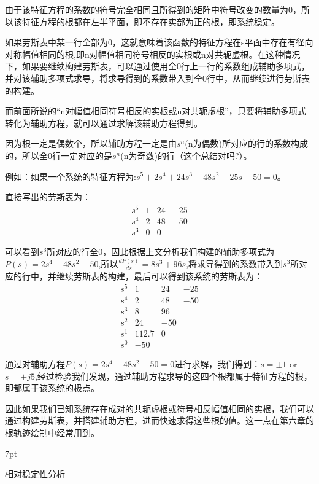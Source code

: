 \documentclass{article}
\numberwithin{equation}{section}
\numberwithin{figure}{section}
\newenvironment{formal}{%
\def\FrameCommand{%
\hspace{1pt}%
{\color{DarkBlue}\vrule width 2pt}%
{\color{formalshade}\vrule width 4pt}%
\colorbox{formalshade}%
}%
\MakeFramed{\advance\hsize-\width\FrameRestore}%
\noindent\hspace{-4.55pt}%
\begin{adjustwidth}{}{7pt}%
\vspace{2pt}\vspace{2pt}%
}
{%
\vspace{2pt}\end{adjustwidth}\endMakeFramed%
}
\begin{document}
由于该特征方程的系数的符号完全相同且所得到的矩阵中符号改变的数量为0，所以该特征方程的根都在左半平面，即不存在实部为正的根，即系统稳定。

如果劳斯表中某一行全部为0，这就意味着该函数的特征方程在s平面中存在有径向对称幅值相同的根,即n对幅值相同符号相反的实根或n对共轭虚根。在这种情况下，如果要继续构建劳斯表，可以通过使用全0行上一行的系数组成辅助多项式，并对该辅助多项式求导，将求导得到的系数带入到全0行中，从而继续进行劳斯表的构建。

而前面所说的“n对幅值相同符号相反的实根或n对共轭虚根”，只要将辅助多项式转化为辅助方程，就可以通过求解该辅助方程得到。

因为根一定是偶数个，所以辅助方程一定是由$s^n$(n为偶数)所对应的行的系数构成的，所以全0行一定对应的是$s^n$(n为奇数)的行（这个总结对吗?）。

例如：如果一个系统的特征方程为:$s^5+2s^4+24s^3+48s^2-25s-50=0$。

直接写出的劳斯表为：
\begin{equation}
    \begin{matrix}
        s^5&1&24&-25\\
        s^4&2&48&-50\\
        s^3&0&0
    \end{matrix}
\end{equation}

可以看到$s^3$所对应的行全0，因此根据上文分析我们构建的辅助多项式为$P(s)=2s^4+48s^2-50$,所以$\frac{dP(s)}{ds}=8s^3+96s$,将求导得到的系数带入到$s^3$所对应的行中，并继续劳斯表的构建，最后可以得到该系统的劳斯表为：
\begin{equation}
    \begin{matrix}
        s^5&1&24&-25\\
        s^4&2&48&-50\\
        s^3&8&96\\
        s^2&24&-50\\
        s^1&112.7&0\\
        s^0&-50
    \end{matrix}
\end{equation}

通过对辅助方程$P(s)=2s^4+48s^2-50=0$进行求解，我们得到：$s=±1$ or $s=±j5$,经过检验我们发现，通过辅助方程求导的这四个根都属于特征方程的根，即都属于该系统的极点。

因此如果我们已知系统存在成对的共轭虚根或符号相反幅值相同的实根，我们可以通过构建劳斯表，并搭建辅助方程，进而快速求得这些根的值。这一点在第六章的根轨迹绘制中经常用到。

\begin{formal}
    相对稳定性分析
\end{formal}
\end{document}
